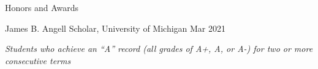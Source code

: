 \documentclass{resume}
\begin{document}
\begin{rSection}{Honors and Awards}
	\begin{rSubsection}{James B. Angell Scholar}{, University of Michigan \hfill Mar 2021}
        \item \textit{Students who achieve an “A” record (all grades of A+, A, or A-) for two or more consecutive terms}
	\end{rSubsection}
\end{rSection}
\end{document}
